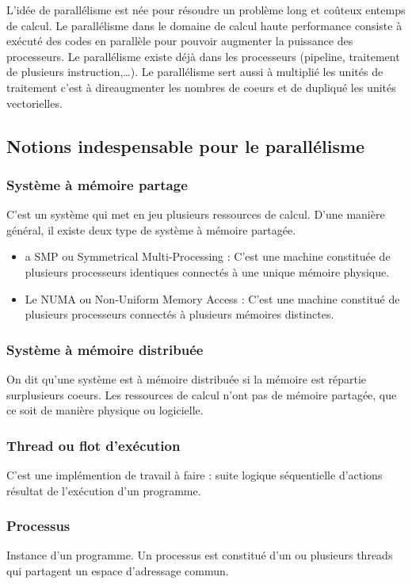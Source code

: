 \documentclass[11pt]{article}
\begin{document}
L’idée de parallélisme est née pour résoudre un problème long et coûteux entemps de calcul.
Le parallélisme dans le domaine de calcul haute performance consiste à exécuté des codes en parallèle pour pouvoir augmenter la puissance des processeurs.
Le parallélisme existe déjà dans les processeurs (pipeline, traitement de plusieurs instruction,\ldots{}).
Le parallélisme sert aussi à multiplié les unités de traitement c’est à direaugmenter les nombres de coeurs et de dupliqué les unités vectorielles.

\subsection{Notions indespensable pour le parallélisme}
\label{sec:org45a0bae}
\subsubsection{Système à mémoire partage}
\label{sec:orgc06b532}

C’est un système qui met en jeu plusieurs ressources de calcul. D’une manière général, il existe deux type de système à mémoire partagée.
\begin{itemize}
\item a SMP ou Symmetrical Multi-Processing : C’est une machine constituée de plusieurs processeurs identiques connectés à une unique mémoire physique.
\item Le NUMA ou Non-Uniform Memory Access : C’est une machine constitué de plusieurs processeurs connectés à plusieurs mémoires distinctes.
\end{itemize}

\subsubsection{Système à mémoire distribuée}
\label{sec:org9a61031}
On dit qu’une système est à mémoire distribuée si la mémoire est répartie surplusieurs coeurs.
Les ressources de calcul n’ont pas de mémoire partagée, que ce soit de manière physique ou logicielle.
\subsubsection{Thread ou flot d’exécution}
\label{sec:org3686438}
C’est une implémention de travail à faire : suite logique séquentielle d’actions résultat de l’exécution d’un programme.
\subsubsection{Processus}
\label{sec:org823e0f7}
Instance d’un programme. Un processus est constitué d’un ou plusieurs threads qui partagent un espace d’adressage commun.
\end{document}
